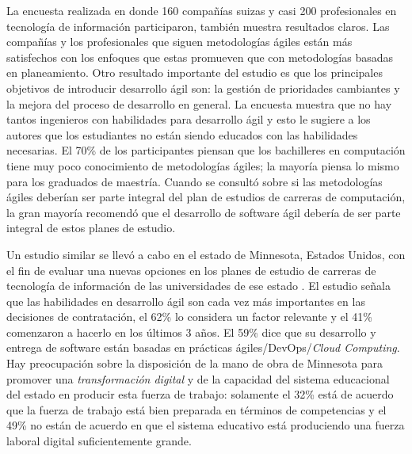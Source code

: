 La encuesta realizada en \cite{kropp-meier-1} donde 160 compañías suizas y casi 200 profesionales en tecnología de información participaron, también muestra resultados claros. Las compañías y los profesionales que siguen metodologías ágiles están más satisfechos con los enfoques que estas promueven que con metodologías basadas en planeamiento. Otro resultado importante del estudio es que los principales objetivos de introducir desarrollo ágil son: la gestión de prioridades cambiantes y la mejora del proceso de desarrollo en general. La encuesta muestra que no hay tantos ingenieros con habilidades para desarrollo ágil y esto le sugiere a los autores que los estudiantes no están siendo educados con las habilidades necesarias. El 70\% de los participantes piensan que los bachilleres en computación tiene muy poco conocimiento de metodologías ágiles; la mayoría piensa lo mismo para los graduados de maestría. Cuando se consultó sobre si las metodologías ágiles deberían ser parte integral del plan de estudios de carreras de computación, la gran mayoría recomendó que el desarrollo de software ágil debería de ser parte integral de estos planes de estudio.

Un estudio similar se llevó a cabo en el estado de Minnesota, Estados Unidos, con el fin de evaluar una nuevas opciones en los planes de estudio de carreras de tecnología de información de las universidades de ese estado \cite{advance-it}. El estudio señala que las habilidades en desarrollo ágil son cada vez más importantes en las decisiones de contratación, el 62\% lo considera un factor relevante y el 41\% comenzaron a hacerlo en los últimos 3 años. El 59\% dice que su desarrollo y entrega de software están basadas en prácticas ágiles/DevOps/\emph{Cloud Computing}. Hay preocupación sobre la disposición de la mano de obra de Minnesota para promover una \emph{transformación digital} y de la capacidad del sistema educacional del estado en producir esta fuerza de trabajo: solamente el 32\% está de acuerdo que la fuerza de trabajo está bien preparada en términos de competencias y el 49\% no están de acuerdo en que el sistema educativo está produciendo una fuerza laboral digital suficientemente grande.

